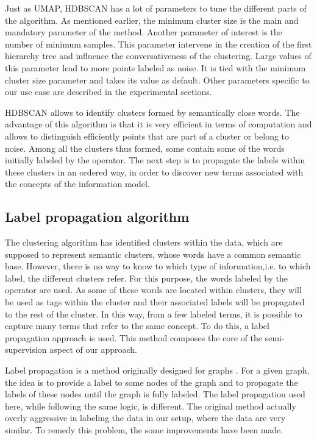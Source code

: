 Just as UMAP, HDBSCAN has a lot of parameters to tune the different parts of the algorithm.
As mentioned earlier, the minimum cluster size is the main and mandatory parameter of the
method.
Another parameter of interest is the number of minimum samples.
This parameter intervene in the creation of the first hierarchy tree and influence the
conversativeness of the clustering. Large values of this parameter lead to more points
labeled as noise.
It is tied with the minimum cluster size parameter and takes its value as default.
Other parameters specific to our use case are described in the experimental sections.

HDBSCAN allows to identify clusters formed by semantically close words.
The advantage of this algorithm is that it is very efficient in terms of computation and
allows to distinguish efficiently points that are part of a cluster or belong to noise.
Among all the clusters thus formed, some contain some of the words initially labeled by the operator.
The next step is to propagate the labels within these clusters in an ordered way,
in order to discover new terms associated with the concepts of the information model.

\subsection{Label propagation algorithm}
The clustering algorithm has identified clusters within the data, which are supposed to
represent semantic clusters, whose words have a common semantic base.
However, there is no way to know to which type of information,i.e. to which label, the different clusters refer.
For this purpose, the words labeled by the operator are used.
As some of these words are located within clusters, they will be used as tags within the
cluster and their associated labels will be propagated to the rest of the cluster.
In this way, from a few labeled terms, it is possible to capture many terms that refer to the same concept.
To do this, a label propagation approach is used.
This method composes the core of the semi-supervision aspect of our approach.

Label propagation is a method originally designed for graphs \parencite{zhuLearningLabeledUnlabeled2002}.
For a given graph, the idea is to provide a label to some nodes of the graph and to propagate
the labels of these nodes until the graph is fully labeled.
The label propagation used here, while following the same logic, is different.
The original method actually overly aggressive in labeling the data in our setup, where
the data are very similar.
To remedy this problem, the some improvements have been made.

